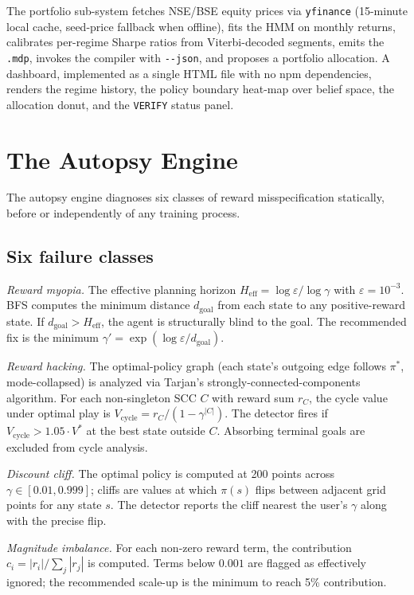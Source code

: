 \documentclass[conference]{IEEEtran}
\begin{document}
The portfolio sub-system fetches NSE/BSE equity prices via
\texttt{yfinance} (15-minute local cache, seed-price fallback when
offline), fits the HMM on monthly returns, calibrates per-regime
Sharpe ratios from Viterbi-decoded segments, emits the
\texttt{.mdp}, invokes the compiler with \texttt{-{}-json}, and
proposes a portfolio allocation. A dashboard, implemented as a
single HTML file with no npm dependencies, renders the regime
history, the policy boundary heat-map over belief space, the
allocation donut, and the \texttt{VERIFY} status panel.

\section{The Autopsy Engine}\label{sec:autopsy}

The autopsy engine diagnoses six classes of reward misspecification
statically, before or independently of any training process.

\subsection{Six failure classes}

\emph{Reward myopia.} The effective planning horizon
$H_\text{eff} = \log\varepsilon / \log\gamma$ with
$\varepsilon = 10^{-3}$. BFS computes the minimum distance
$d_\text{goal}$ from each state to any positive-reward state. If
$d_\text{goal} > H_\text{eff}$, the agent is structurally blind to
the goal. The recommended fix is the minimum
$\gamma' = \exp(\log\varepsilon / d_\text{goal})$.

\emph{Reward hacking.} The optimal-policy graph (each state's
outgoing edge follows $\pi^*$, mode-collapsed) is analyzed via
Tarjan's strongly-connected-components algorithm. For each
non-singleton SCC $C$ with reward sum $r_C$, the cycle value under
optimal play is $V_\text{cycle} = r_C / (1 - \gamma^{|C|})$. The
detector fires if $V_\text{cycle} > 1.05 \cdot V^*$ at the best
state outside $C$. Absorbing terminal goals are excluded from cycle
analysis.

\emph{Discount cliff.} The optimal policy is computed at 200 points
across $\gamma \in [0.01, 0.999]$; cliffs are values at which
$\pi(s)$ flips between adjacent grid points for any state $s$. The
detector reports the cliff nearest the user's $\gamma$ along with
the precise flip.

\emph{Magnitude imbalance.} For each non-zero reward term, the
contribution $c_i = |r_i| / \sum_j |r_j|$ is computed. Terms below
$0.001$ are flagged as effectively ignored; the recommended
scale-up is the minimum to reach 5\% contribution.
\end{document}

